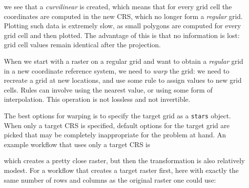 \documentclass[]{book}
\newenvironment{Shaded}{\begin{snugshade}}{\end{snugshade}}
\newcommand{\CommentTok}[1]{\textcolor[rgb]{0.56,0.35,0.01}{\textit{#1}}}
\newcommand{\DataTypeTok}[1]{\textcolor[rgb]{0.13,0.29,0.53}{#1}}
\newcommand{\DecValTok}[1]{\textcolor[rgb]{0.00,0.00,0.81}{#1}}
\newcommand{\KeywordTok}[1]{\textcolor[rgb]{0.13,0.29,0.53}{\textbf{#1}}}
\newcommand{\NormalTok}[1]{#1}
\newcommand{\OperatorTok}[1]{\textcolor[rgb]{0.81,0.36,0.00}{\textbf{#1}}}
\newcommand{\StringTok}[1]{\textcolor[rgb]{0.31,0.60,0.02}{#1}}
\begin{document}
we see that a \emph{curvilinear} is created, which means that for every
grid cell the coordinates are computed in the new CRS, which no
longer form a \emph{regular} grid. Plotting such data is extremely slow,
as small polygons are computed for every grid cell and then plotted.
The advantage of this is that no information is lost: grid cell
values remain identical after the projection.

When we start with a raster on a regular grid and want to obtain
a \emph{regular} grid in a new coordinate reference system, we need
to \emph{warp} the grid: we need to recreate a grid at new locations,
and use some rule to assign values to new grid cells. Rules can
involve using the nearest value, or using some form of interpolation.
This operation is not lossless and not invertible.

The best options for warping is to specify the target grid as a
\texttt{stars} object. When only a target CRS is specified, default options
for the target grid are picked that may be completely inappropriate
for the problem at hand. An example workflow that uses only a
target CRS is

\begin{Shaded}
\end{Shaded}

which creates a pretty close raster, but then the transformation
is also relatively modest. For a workflow that creates a target
raster first, here with exactly the same number of rows and columns
as the original raster one could use:
\end{document}
